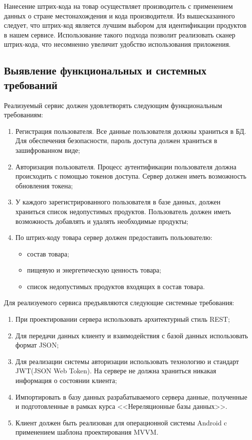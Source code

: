 Нанесение штрих-кода на товар осуществляет производитель с применением данных о стране местонахождения и кода производителя. Из вышесказанного следует, что штрих-код является лучшим выбором для идентификации продуктов в нашем сервисе. Использование такого подхода позволит реализовать сканер штрих-кода, что несомненно увеличит удобство использования приложения.


\subsection{Выявление функциональных и системных требований}
Реализуемый сервис должен удовлетворять следующим функциональным требованиям:
\begin{enumerate}
	\item Регистрация пользователя. Все данные пользователя должны храниться в БД. Для обеспечения безопасности, пароль доступа должен храниться в зашифрованном виде;
	\item Авторизация пользователя. Процесс аутентификации пользователя должна происходить с помощью токенов доступа. Сервер должен иметь возможность обновления токена;
	\item У каждого зарегистрированного пользователя в базе данных, должен храниться список недопустимых продуктов. Пользователь должен иметь возможность добавлять и удалять необходимые продукты;
	\item По штрих-коду товара сервер должен предоставить пользователю:
	 \begin{itemize}
	 	\item состав товара;
	 	\item пищевую и энергетическую ценность товара;
	 	\item список недопустимых продуктов входящих в состав товара. 
	\end{itemize}
\end{enumerate}

Для реализуемого сервиса предъявляются следующие системные требования:

\begin{enumerate}
	\item При проектировании сервера использовать архитектурный стиль REST;
	\item Для передачи данных клиенту и взаимодействия с базой данных использовать формат JSON;
	\item Для реализации системы авторизации использовать технологию и стандарт JWT(JSON Web Token). На сервере не должна храниться никакая  информация о состоянии клиента;
	\item Импортировать в базу данных разрабатываемого сервера данные, полученные и подготовленные в рамках курса <<Нереляционные базы данных>>.
	\item Клиент должен быть реализован для операционной системы Android c применением шаблона проектирования MVVM. 
\end{enumerate}

